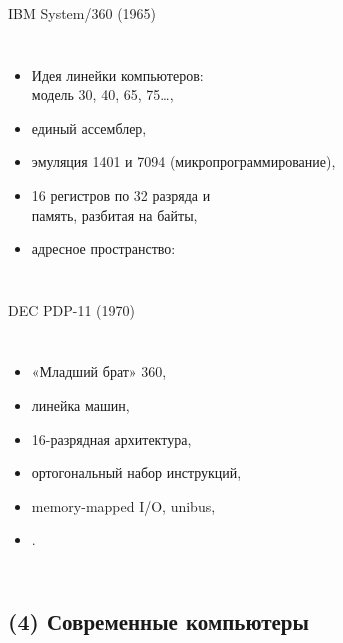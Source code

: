 \begin{frame}{IBM System/360 (1965)}
\begin{columns}
    \column{6cm}
\begin{itemize}[<+->]
    \item Идея линейки компьютеров:\\модель 30, 40, 65, 75…,
    \item единый ассемблер,
    \item эмуляция 1401 и 7094 (микропрограммирование),
    \item 16 регистров по 32 разряда и\\
        память, разбитая на \alert{байты},
    \item адресное пространство:\\
\end{itemize}


    \column{5cm}
\end{columns}


\end{frame}

\begin{frame}{DEC PDP-11 (1970)}
\begin{columns}
    \column{7cm}
\begin{itemize}%
    \item «Младший брат» 360,
    \item линейка машин,
    \item 16-разрядная архитектура,
    \item ортогональный набор инструкций,
    \item memory-mapped I/O, unibus,
    \item {}.
\end{itemize}

    \column{5cm}
\end{columns}
\end{frame}

\subsection {(4) Современные компьютеры}

